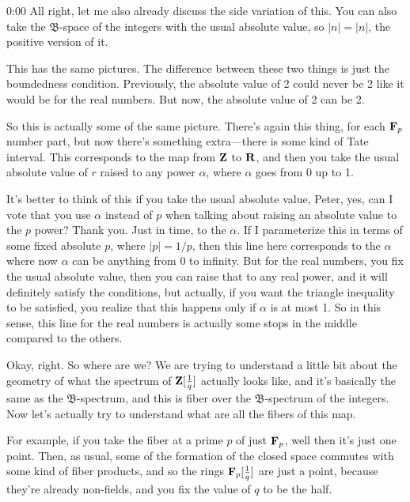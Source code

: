 \begin{unfinished}{0:00}
All right, let me also already discuss the side variation of this. You can also take the $\mathfrak{B}$-space of the integers with the usual absolute value, so $\lvert n \rvert = |n|$, the positive version of it. 

This has the same pictures. The difference between these two things is just the boundedness condition. Previously, the absolute value of 2 could never be 2 like it would be for the real numbers. But now, the absolute value of 2 can be 2.

So this is actually some of the same picture. There's again this thing, for each $\mathbf F_p$ number part, but now there's something extra---there is some kind of Tate interval. This corresponds to the map from $\mathbf Z$ to $\mathbf R$, and then you take the usual absolute value of $r$ raised to any power $\alpha$, where $\alpha$ goes from 0 up to 1. 

It's better to think of this if you take the usual absolute value, Peter, yes, can I vote that you use $\alpha$ instead of $p$ when talking about raising an absolute value to the $p$ power? Thank you. Just in time, to the $\alpha$. If I parameterize this in terms of some fixed absolute $p$, where $|p| = 1/p$, then this line here corresponds to the $\alpha$ where now $\alpha$ can be anything from 0 to infinity. But for the real numbers, you fix the usual absolute value, then you can raise that to any real power, and it will definitely satisfy the conditions, but actually, if you want the triangle inequality to be satisfied, you realize that this happens only if $\alpha$ is at most 1. So in this sense, this line for the real numbers is actually some stops in the middle compared to the others.

Okay, right. So where are we? We are trying to understand a little bit about the geometry of what the spectrum of $\mathbf Z[\frac{1}{q}]$ actually looks like, and it's basically the same as the $\mathfrak{B}$-spectrum, and this is fiber over the $\mathfrak{B}$-spectrum of the integers. Now let's actually try to understand what are all the fibers of this map.

For example, if you take the fiber at a prime $p$ of just $\mathbf F_p$, well then it's just one point. Then, as usual, some of the formation of the closed space commutes with some kind of fiber products, and so the rings $\mathbf F_p[\frac{1}{q}]$ are just a point, because they're already non-fields, and you fix the value of $q$ to be the half.


\end{unfinished}
